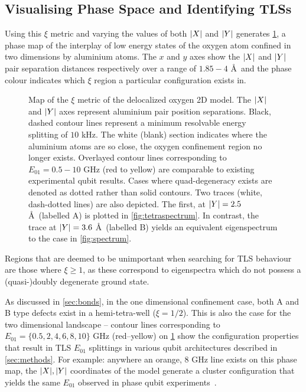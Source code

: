 \subsection{Visualising Phase Space and Identifying TLSs}\label{sec:phasespace}

Using this $\xi$ metric and varying the values of both $\lvert X\rvert$ and $\lvert Y\rvert$ generates \cref{fig:xiunbound}, a phase map of the interplay of low energy states of the oxygen atom confined in two dimensions by aluminium atoms.
The $x$ and $y$ axes show the $\lvert X\rvert$ and $\lvert Y\rvert$ pair separation distances respectively over a range of $1.85\!-\!4$ \AA\ and the phase colour indicates which $\xi$ region a particular configuration exists in.

\begin{figure}[htp]
\caption[fig7]{\label{fig:xiunbound}Map of the $\xi$ metric of the delocalized oxygen 2D model. The $\lvert X\rvert$ and $\lvert Y\rvert$ axes represent aluminium pair position separations. Black, dashed contour lines represent a minimum resolvable energy splitting of $10$ kHz. The white (blank) section indicates where the aluminium atoms are so close, the oxygen confinement region no longer exists. Overlayed contour lines corresponding to $E_{01} = 0.5\!-\!10$ GHz (red to yellow) are comparable to existing experimental qubit results. Cases where quad-degeneracy exists are denoted as dotted rather than solid contours. Two traces (white, dash-dotted lines) are also depicted. The first, at $\lvert Y\rvert = 2.5$ \AA\ (labelled A) is plotted in \cref{fig:tetraspectrum}. In contrast, the trace at $\lvert Y\rvert = 3.6$ \AA\ (labelled B) yields an equivalent eigenspectrum to the  case in \cref{fig:spectrum}. }
\end{figure}

Regions that are deemed to be unimportant when searching for TLS behaviour are those where $\xi \geq 1$, as these correspond to eigenspectra which do not possess a (quasi-)doubly degenerate ground state.

As discussed in \cref{sec:bonds}, in the one dimensional confinement case, both A and B type defects exist in a hemi-tetra-well ($\xi = 1/2$).
This is also the case for the two dimensional landscape -- contour lines corresponding to $E_{01} = \{0.5, 2, 4, 6, 8, 10\}$ GHz (red--yellow) on \cref{fig:xiunbound} show the configuration properties that result in TLS $E_{01}$ splittings in various qubit architectures described in \cref{sec:methods}.
For example: anywhere an orange, $8$ GHz line exists on this phase map, the $\lvert X\rvert, \lvert Y\rvert$ coordinates of the model generate a cluster configuration that yields the same $E_{01}$ observed in phase qubit experiments~\cite{Cole2010}.

